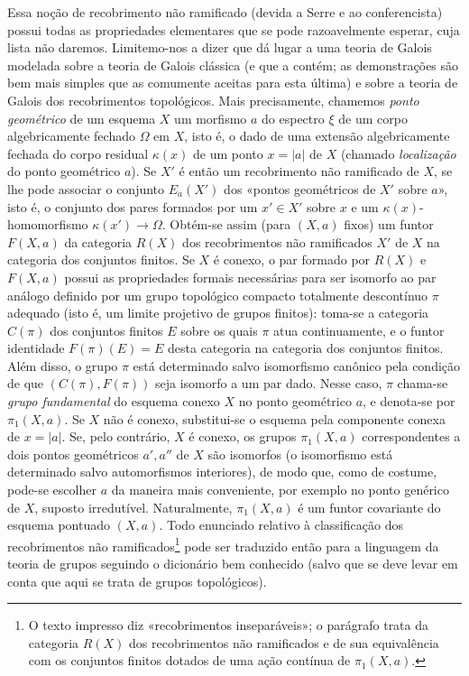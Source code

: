 \documentclass[11pt,twoside,openany]{book}
\numberwithin{equation}{section}
\newcommand{\src}[1]{%
  \phantomsection\hypertarget{src:#1}{}%
  \marginpar{\raggedleft\footnotesize\sffamily #1}%
}
\theoremstyle{plain}
\theoremstyle{definition}
\theoremstyle{remark}
\newcommand{\FgaUnitKey}{frontmatter}
\renewcommand{\src}[1]{%
  \phantomsection\hypertarget{src:\FgaUnitKey:#1}{}%
  \marginpar{\raggedleft\footnotesize\sffamily #1}%
}
\begin{document}
\src{210}
Essa noção de recobrimento não ramificado (devida a Serre e ao conferencista)
possui todas as propriedades elementares que se pode razoavelmente esperar, cuja
lista não daremos. Limitemo-nos a dizer que dá lugar a uma teoria de Galois
modelada sobre a teoria de Galois clássica (e que a contém; as
demonstrações são bem mais simples que as comumente aceitas para
esta última) e sobre a teoria de Galois dos recobrimentos topológicos. Mais
precisamente, chamemos \emph{ponto geométrico} de um esquema $X$ um morfismo
$a$ do espectro $\xi$ de um corpo algebricamente fechado $\Omega$ em $X$,
isto é, o dado de uma extensão algebricamente fechada do corpo residual
$\kappa(x)$ de um ponto $x=|a|$ de $X$ (chamado \emph{localização} do ponto
geométrico $a$). Se $X'$ é então um recobrimento não ramificado de $X$, se
lhe pode associar o conjunto $E_a(X')$ dos «pontos geométricos de $X'$ sobre
$a$», isto é, o conjunto dos pares formados por um $x'\in X'$ sobre $x$
e um $\kappa(x)$-homomorfismo $\kappa(x')\longrightarrow\Omega$. Obtém-se assim
(para $(X,a)$ fixos) um funtor $F(X,a)$ da categoria $R(X)$ dos
recobrimentos não ramificados $X'$ de $X$ na categoria dos conjuntos
finitos. Se $X$ é conexo, o par formado por $R(X)$ e $F(X,a)$ possui as
propriedades formais necessárias para ser isomorfo ao par análogo definido por
um grupo topológico compacto totalmente descontínuo $\pi$ adequado (isto é,
um limite projetivo de grupos finitos): toma-se a categoria $C(\pi)$ dos
conjuntos finitos $E$ sobre os quais $\pi$ atua continuamente, e o funtor
identidade $F(\pi)(E)=E$ desta categoria na categoria dos conjuntos
finitos. Além disso, o grupo $\pi$ está determinado salvo isomorfismo canônico pela
condição de que $(C(\pi),F(\pi))$ seja isomorfo a um par dado. Nesse caso,
$\pi$ chama-se \emph{grupo fundamental} do esquema conexo $X$ no ponto
geométrico $a$, e denota-se por $\pi_1(X,a)$. Se $X$ não é conexo, substitui-se
o esquema pela componente conexa de $x=|a|$. Se, pelo contrário, $X$ é
conexo, os grupos $\pi_1(X,a)$ correspondentes a dois pontos geométricos
$a',a''$ de $X$ são isomorfos (o isomorfismo está determinado salvo
automorfismos interiores), de modo que, como de costume, pode-se escolher $a$
da maneira mais conveniente, por exemplo no ponto genérico de $X$, suposto
irredutível. Naturalmente, $\pi_1(X,a)$ é um funtor covariante do esquema
pontuado $(X,a)$. Todo enunciado relativo à classificação dos
recobrimentos não ramificados\footnote{O texto impresso diz «recobrimentos
inseparáveis»; o parágrafo trata da categoria $R(X)$ dos recobrimentos não
ramificados e de sua equivalência com os conjuntos finitos dotados de uma ação
contínua de $\pi_1(X,a)$.} pode ser traduzido então para a linguagem da teoria de
grupos seguindo o dicionário bem conhecido (salvo que se deve levar em conta
que aqui se trata de grupos topológicos).
\end{document}
